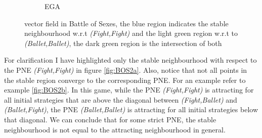 \begin{figure}[H]
\begin{subfigure}{.5\textwidth}
    \caption{EGA}
\end{subfigure}
\caption{vector field in Battle of Sexes,
the blue region indicates the stable neighbourhood w.r.t \textit{(Fight,Fight)} and the light green region w.r.t to \textit{(Ballet,Ballet)}, the dark green region is the intersection of both}
\label{fig:BOS1}
\end{figure}

For clarification I have highlighted only the stable neighbourhood with respect to the PNE \textit{(Fight,Fight)} in figure \ref{fig:BOS2a}. Also, notice that not all points in the stable region converge to the corresponding PNE. For an example refer to example \ref{fig:BOS2b}. In this game, while the PNE \textit{(Fight,Fight)} is attracting for all initial strategies that are above the diagonal between \textit{(Fight,Ballet)} and \textit{(Ballet,Fight)}, the PNE \textit{(Ballet,Ballet)} is attracting for all initial strategies below that diagonal. We can conclude that for some strict PNE, the stable neighbourhood is not equal to the attracting neighbourhood in general.


